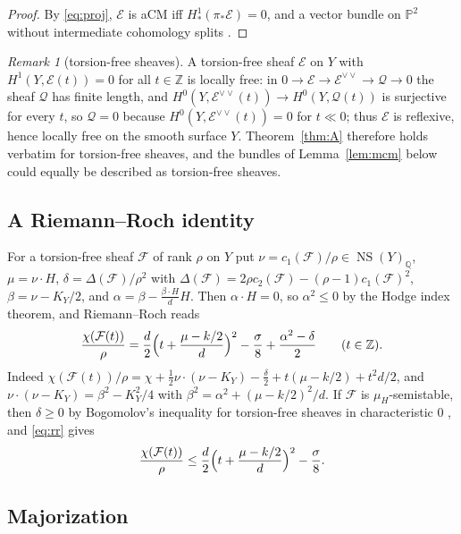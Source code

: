 \documentclass[11pt]{amsart}
\theoremstyle{remark}
\newtheorem{remark}[theorem]{Remark}
\theoremstyle{definition}
\newcommand{\PP}{\mathbb{P}}
\newcommand{\ZZ}{\mathbb{Z}}
\newcommand{\QQ}{\mathbb{Q}}
\newcommand{\cE}{\mathcal{E}}
\newcommand{\cF}{\mathcal{F}}
\newcommand{\cQ}{\mathcal{Q}}
\newcommand{\NS}{\operatorname{NS}}
\begin{document}
\begin{proof}
By \eqref{eq:proj}, $\cE$ is aCM iff $H^1_*(\pi_*\cE)=0$, and a vector bundle on $\PP^2$ without intermediate cohomology splits \cite{Ho}.
\end{proof}

\begin{remark}[torsion-free sheaves]\label{rem:tf}
A torsion-free sheaf $\cE$ on $Y$ with $H^1(Y,\cE(t))=0$ for all $t\in\ZZ$ is locally free: in $0\to\cE\to\cE^{\vee\vee}\to\cQ\to0$ the sheaf $\cQ$ has finite length, and $H^0(Y,\cE^{\vee\vee}(t))\to H^0(Y,\cQ(t))$ is surjective for every $t$, so $\cQ=0$ because $H^0(Y,\cE^{\vee\vee}(t))=0$ for $t\ll0$; thus $\cE$ is reflexive, hence locally free on the smooth surface $Y$. Theorem~\ref{thm:A} therefore holds verbatim for torsion-free sheaves, and the bundles of Lemma~\ref{lem:mcm} below could equally be described as torsion-free sheaves.
\end{remark}

\subsection*{A Riemann--Roch identity}
For a torsion-free sheaf $\cF$ of rank $\rho$ on $Y$ put $\nu=c_1(\cF)/\rho\in\NS(Y)_\QQ$, $\mu=\nu\cdot H$, $\delta=\Delta(\cF)/\rho^2$ with $\Delta(\cF)=2\rho c_2(\cF)-(\rho-1)c_1(\cF)^2$, $\beta=\nu-K_Y/2$, and $\alpha=\beta-\frac{\beta\cdot H}{d}H$. Then $\alpha\cdot H=0$, so $\alpha^2\le0$ by the Hodge index theorem, and Riemann--Roch reads
\begin{equation}\label{eq:rr}
\frac{\chi(\cF(t))}{\rho}=\frac d2\Bigl(t+\frac{\mu-k/2}{d}\Bigr)^2-\frac{\sigma}{8}+\frac{\alpha^2-\delta}{2}\qquad(t\in\ZZ).
\end{equation}
Indeed $\chi(\cF(t))/\rho=\chi+\tfrac12\nu\cdot(\nu-K_Y)-\tfrac\delta2+t(\mu-k/2)+t^2d/2$, and $\nu\cdot(\nu-K_Y)=\beta^2-K_Y^2/4$ with $\beta^2=\alpha^2+(\mu-k/2)^2/d$. If $\cF$ is $\mu_H$-semistable, then $\delta\ge0$ by Bogomolov's inequality for torsion-free sheaves in characteristic $0$ \cite[Thm.~3.4.1]{HL}, and \eqref{eq:rr} gives
\begin{equation}\label{eq:ss}
\frac{\chi(\cF(t))}{\rho}\le\frac d2\Bigl(t+\frac{\mu-k/2}{d}\Bigr)^2-\frac{\sigma}{8}.
\end{equation}

\subsection*{Majorization}
\end{document}

